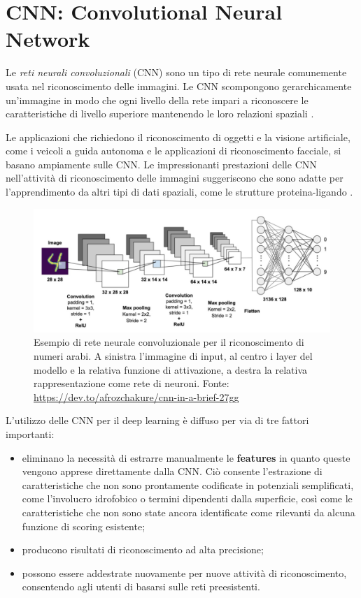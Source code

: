 \section{CNN: Convolutional Neural Network}

Le \textit{reti neurali convoluzionali} (CNN) sono un tipo di rete neurale comunemente usata nel riconoscimento delle immagini. Le CNN scompongono gerarchicamente un'immagine in modo che ogni livello della rete impari a riconoscere le caratteristiche di livello superiore mantenendo le loro relazioni spaziali \cite{ragoza_protein-ligand_2017}.

Le applicazioni che richiedono il riconoscimento di oggetti e la visione artificiale, come i veicoli a guida autonoma e le applicazioni di riconoscimento facciale, si basano ampiamente sulle CNN.
Le impressionanti prestazioni delle CNN nell'attività di riconoscimento delle immagini suggeriscono che sono adatte per l'apprendimento da altri tipi di dati spaziali, come le strutture proteina-ligando \cite{ragoza_protein-ligand_2017}. 

\begin{figure}[H]
    \centering
    \includegraphics[scale=0.55]{images/convNet.jpg}
    \caption[Esempio di CNN per il riconoscimento di numeri arabi.]{Esempio di rete neurale convoluzionale per il riconoscimento di numeri arabi. A sinistra l'immagine di input, al centro i layer del modello e la relativa funzione di attivazione, a destra la relativa rappresentazione come rete di neuroni. Fonte: \url{https://dev.to/afrozchakure/cnn-in-a-brief-27gg}}
    \label{fig:conv_net}
\end{figure}

L’utilizzo delle CNN per il deep learning è diffuso per via di tre fattori importanti:
\begin{itemize}
    \item eliminano la necessità di estrarre manualmente le \textbf{features} in quanto queste vengono apprese direttamente dalla CNN. Ciò consente l'estrazione di caratteristiche che non sono prontamente codificate in potenziali semplificati, come l'involucro idrofobico o termini dipendenti dalla superficie, così come le caratteristiche che non sono state ancora identificate come rilevanti da alcuna funzione di scoring esistente;
    \item producono risultati di riconoscimento ad alta precisione;
    \item possono essere addestrate nuovamente per nuove attività di riconoscimento, consentendo agli utenti di basarsi sulle reti preesistenti.
\end{itemize}

